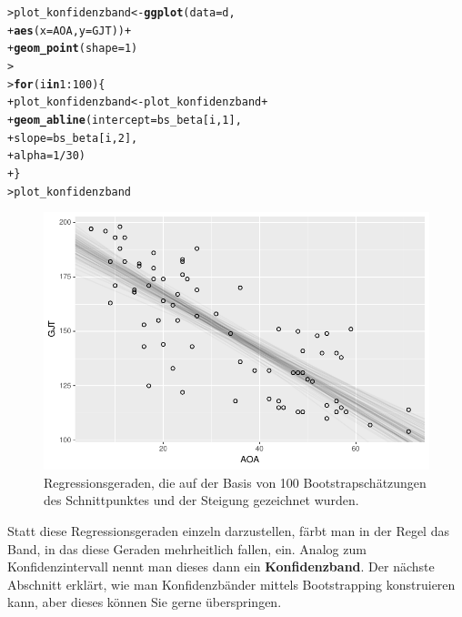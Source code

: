 \documentclass[oneside, 10pt]{book}\usepackage[]{graphicx}\usepackage[]{xcolor}
\makeatletter
\newcommand{\hlnum}[1]{\textcolor[rgb]{0.686,0.059,0.569}{#1}}%
\newcommand{\hlopt}[1]{\textcolor[rgb]{0,0,0}{#1}}%
\newcommand{\hlstd}[1]{\textcolor[rgb]{0.345,0.345,0.345}{#1}}%
\newcommand{\hlkwa}[1]{\textcolor[rgb]{0.161,0.373,0.58}{\textbf{#1}}}%
\newcommand{\hlkwb}[1]{\textcolor[rgb]{0.69,0.353,0.396}{#1}}%
\newcommand{\hlkwc}[1]{\textcolor[rgb]{0.333,0.667,0.333}{#1}}%
\newcommand{\hlkwd}[1]{\textcolor[rgb]{0.737,0.353,0.396}{\textbf{#1}}}%
\newenvironment{kframe}{%
 \def\at@end@of@kframe{}%
 \ifinner\ifhmode%
  \def\at@end@of@kframe{\end{minipage}}%
  \begin{minipage}{\columnwidth}%
 \fi\fi%
 \def\FrameCommand##1{\hskip\@totalleftmargin \hskip-\fboxsep
 \colorbox{shadecolor}{##1}\hskip-\fboxsep
     \hskip-\linewidth \hskip-\@totalleftmargin \hskip\columnwidth}%
 \MakeFramed {\advance\hsize-\width
   \@totalleftmargin\z@ \linewidth\hsize
   \@setminipage}}%
 {\par\unskip\endMakeFramed%
 \at@end@of@kframe}
\newenvironment{knitrout}{}{} %
\makeatother
\begin{document}
\begin{knitrout}
\color{fgcolor}\begin{kframe}
\begin{alltt}
\hlstd{> }\hlstd{plot_konfidenzband} \hlkwb{<-} \hlkwd{ggplot}\hlstd{(}\hlkwc{data} \hlstd{= d,}
\hlstd{+ }                             \hlkwd{aes}\hlstd{(}\hlkwc{x} \hlstd{= AOA,} \hlkwc{y} \hlstd{= GJT))} \hlopt{+}
\hlstd{+ }  \hlkwd{geom_point}\hlstd{(}\hlkwc{shape} \hlstd{=} \hlnum{1}\hlstd{)}
\hlstd{> }
\hlstd{> }\hlkwa{for} \hlstd{(i} \hlkwa{in} \hlnum{1}\hlopt{:}\hlnum{100}\hlstd{) \{}
\hlstd{+ }  \hlstd{plot_konfidenzband} \hlkwb{<-} \hlstd{plot_konfidenzband} \hlopt{+}
\hlstd{+ }    \hlkwd{geom_abline}\hlstd{(}\hlkwc{intercept} \hlstd{= bs_beta[i,} \hlnum{1}\hlstd{],}
\hlstd{+ }                \hlkwc{slope} \hlstd{= bs_beta[i,} \hlnum{2}\hlstd{],}
\hlstd{+ }                \hlkwc{alpha} \hlstd{=} \hlnum{1}\hlopt{/}\hlnum{30}\hlstd{)}
\hlstd{+ }\hlstd{\}}
\hlstd{> }\hlstd{plot_konfidenzband}
\end{alltt}
\end{kframe}\begin{figure}[tp]

{\centering \includegraphics[width=.7\textwidth]{figs/unnamed-chunk-212-1} 

}

\caption{Regressionsgeraden, die auf der Basis von 100 Bootstrapschätzungen des Schnittpunktes und der Steigung gezeichnet wurden.\label{fig:bootstrapregressionline100}}\label{fig:unnamed-chunk-212}
\end{figure}

\end{knitrout}
Statt diese Regressionsgeraden einzeln darzustellen,
färbt man in der Regel das Band, in das diese Geraden mehrheitlich fallen,
ein. Analog zum Konfidenzintervall nennt man dieses dann ein
\textbf{Konfidenzband}. Der nächste Abschnitt erklärt, wie man
Konfidenzbänder mittels Bootstrapping konstruieren kann, aber dieses
können Sie gerne überspringen.
\end{document}
